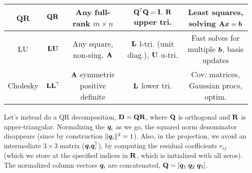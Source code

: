 \documentclass[11pt]{article}
\begin{document}
\begin{enumerate}
\begin{center}
{\begin{tabular}{|c|c|c|c|c|}
                      \hline
                      QR                                                       &
                      $\mathbf{Q} \mathbf{R}$                                        &
                      Any full-rank $m \times n$                               &
                      $\mathbf{Q}^{\mkern-2.5mu\top\mkern-2mu} \mathbf{Q} = \mathbf{I}, \; \mathbf{R}$ upper tri.  &
                      Least squares, solving $\mathbf{A}\bm{x}=\bm{b}$                                                                  \\
                      \hline
                      LU                                                       &
                      $\mathbf{L} \mathbf{U}$                                        &
                      Any square, non-sing. $\mathbf{A}$                          &
                      $\mathbf{L}$ l-tri. (unit diag.), $\mathbf{U}$ u-tri.          &
                      Fast solves for multiple $\bm{b}$, basis updates                                                                 \\
                      \hline
                      Cholesky                                                 &
                      $\mathbf{L} \mathbf{L}^{\mkern-2.5mu\top\mkern-2mu}$                                   &
                      $\mathbf{A}$ symmetric positive definite                    &
                      $\mathbf{L}$ lower tri.                                     &
                      Cov. matrices, Gaussian procs, optim.                                                                              \\
                      \hline
                  \end{tabular}%
              }
          \end{center}

          \pagebreak

          Let's instead do a QR decomposition, $\mathbf{D} = \mathbf{Q} \mathbf{R}$, where $\mathbf{Q}$ is
          orthogonal and $\mathbf{R}$ is upper-triangular.  Normalizing the $\bm{q}_i$ as we go, the
          squared norm denominator disappears (since by construction $\lVert\bm{q}_i\rVert^2 = 1$).
          Also, in the projection, we avoid an intermediate $3 \times 3$ matrix ($\bm{q}_i
              \bm{q}_i^{\mkern-2.5mu\top\mkern-2mu}$), by computing the residual coefficients $r_{ij}$ (which we store at the
          specified indices in $\mathbf{R}$, which is initialized with all zeros).  The normalized
          column vectors $\bm{q}_i$ are concatenated, $\mathbf{Q} = [ \bm{q}_1 \; \bm{q}_2 \;
              \bm{q}_3 ]$.


\end{enumerate}
\end{document}

